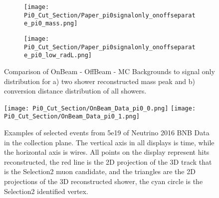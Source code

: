 \documentclass{article}
\begin{document}
\begin{figure}[h!]
\centering
  \begin{subfigure}[t]{0.3\textwidth}
    \centering
\texttt{[image: Pi0\_Cut\_Section/Paper\_pi0signalonly\_onoffseparate\_pi0\_mass.png]}
  \caption{ }
  \end{subfigure} 
  \hspace{30mm}
  \begin{subfigure}[t]{0.3\textwidth}
    \centering
\texttt{[image: Pi0\_Cut\_Section/Paper\_pi0signalonly\_onoffseparate\_pi0\_low\_radL.png]}
  \caption{ }
  \end{subfigure} 
\caption{ Comparison of OnBeam - OffBeam - MC Backgrounds to signal only distribution for a) two shower reconstructed mass peak and b) conversion distance distribution of all showers. }
\label{fig:physics_pi0signalonly_mass} 
\end{figure}


\begin{figure}[h!]
\centering
\texttt{[image: Pi0\_Cut\_Section/OnBeam\_Data\_pi0\_0.png]}
\texttt{[image: Pi0\_Cut\_Section/OnBeam\_Data\_pi0\_1.png]}
\caption{ Examples of selected events from 5e19 of Neutrino 2016 BNB Data in the collection plane. The vertical axis in all displays is time, while the horizontal axis is wires. All points on the display represent hits reconstructed, the red line is the 2D projection of the 3D track that is the Selection2 muon candidate, and the triangles are the 2D projections of the 3D reconstructed shower, the cyan circle is the Selection2 identified vertex. }
\label{fig:physics_pi0_onbeam_eventdisplays}
\end{figure}

\clearpage
\end{document}

